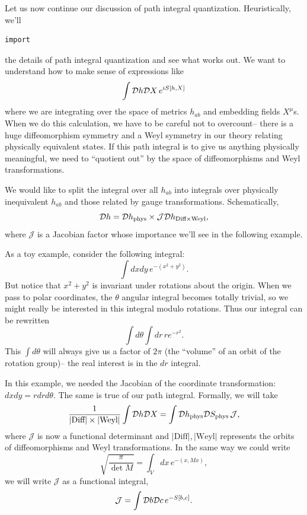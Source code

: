 Let us now continue our discussion of path integral quantization. Heuristically, we'll \begin{verbatim}import\end{verbatim} the details of path integral quantization and see what works out. We want to understand how to make sense of expressions like
\begin{equation}
    \int \mathcal{D} h \mathcal{D} X \,e^{iS[h,X]}
\end{equation}
where we are integrating over the space of metrics $h_{ab}$ and embedding fields $X^\mu$s. When we do this calculation, we have to be careful not to overcount-- there is a huge diffeomorphism symmetry and a Weyl symmetry in our theory relating physically equivalent states. If this path integral is to give us anything physically meaningful, we need to ``quotient out'' by the space of diffeomorphisms and Weyl transformations.

We would like to split the integral over all $h_{ab}$ into integrals over physically inequivalent $h_{ab}$ and those related by gauge transformations. Schematically,
\begin{equation}
    \mathcal{D} h = \mathcal{D} h_{\text{phys}}\times \mathcal{J}\mathcal{D} h_{\text{Diff}\times \text{Weyl}},
\end{equation}
where $\mathcal{J}$ is a Jacobian factor whose importance we'll see in the following example.

\begin{exm}
    As a toy example, consider the following integral:
    \begin{equation*}
        \int dxdy\, e^{-(x^2 +y^2)}.
    \end{equation*}
    But notice that $x^2+y^2$ is invariant under rotations about the origin. When we pass to polar coordinates, the $\theta$ angular integral becomes totally trivial, so we might really be interested in this integral modulo rotations. Thus our integral can be rewritten
    \begin{equation*}
        \int d\theta \int dr \, re^{-r^2}.
    \end{equation*}
    This $\int d\theta$ will always give us a factor of $2\pi$ (the  ``volume'' of an orbit of the rotation group)-- the real interest is in the $dr$ integral.
\end{exm}

In this example, we needed the Jacobian of the coordinate transformation: $dxdy=rdr d\theta$. The same is true of our path integral. Formally, we will take
\begin{equation}
    \frac{1}{|\text{Diff}|\times |\text{Weyl}|}\int \mathcal{D} h \mathcal{D} X = \int \mathcal{D} h_{\text{phys}}\mathcal{D} S_{\text{phys}} \,\mathcal{J},
\end{equation}
where $\mathcal{J}$ is now a functional determinant and $|\text{Diff}|, |\text{Weyl}|$ represents the orbits of diffeomorphisms and Weyl transformations.
%
In the same way we could write
\begin{equation}
    \sqrt{\frac{\pi}{\det M}}=\int_V dx \,e^{-(x,Mx)},
\end{equation}
we will write $\mathcal{J}$ as a functional integral,
\begin{equation}
    \mathcal J =\int \mathcal{D} b \mathcal{D} c\, e^{-S[b,c]}.
\end{equation}

